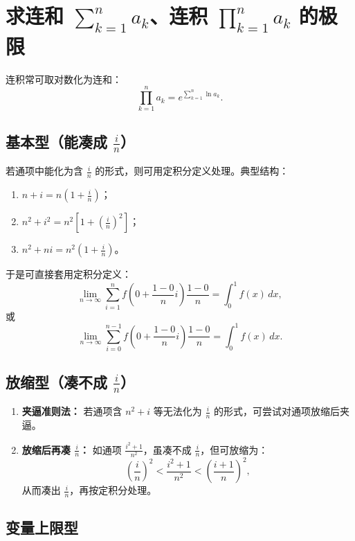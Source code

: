 
\section{求连和 $\sum_{k=1}^{n} a_k$、连积 $\prod_{k=1}^{n} a_k$ 的极限}

连积常可取对数化为连和：
\[
    \prod_{k=1}^{n} a_k = e^{\sum_{k=1}^{n} \ln a_k}.
\]

\subsection{基本型（能凑成 $\frac{i}{n}$）}

若通项中能化为含 $\frac{i}{n}$ 的形式，则可用定积分定义处理。典型结构：

\begin{enumerate}
    \item $n + i = n\left(1 + \frac{i}{n}\right)$；
    \item $n^2 + i^2 = n^2\left[1 + \left(\frac{i}{n}\right)^2\right]$；
    \item $n^2 + ni = n^2\left(1 + \frac{i}{n}\right)$。
\end{enumerate}

于是可直接套用定积分定义：
\[
    \lim_{n \to \infty} \sum_{i=1}^{n} f\!\left(0+\frac{1-0}{n}i\right) \frac{1-0}{n}
    = \int_{0}^{1} f(x)\,dx,
\]
或
\[
    \lim_{n \to \infty} \sum_{i=0}^{n-1} f\!\left(0+\frac{1-0}{n}i\right) \frac{1-0}{n}
    = \int_{0}^{1} f(x)\,dx.
\]

\subsection{放缩型（凑不成 $\frac{i}{n}$）}

\begin{enumerate}
    \item \textbf{夹逼准则法：}
          若通项含 $n^2+i$ 等无法化为 $\frac{i}{n}$ 的形式，可尝试对通项放缩后夹逼。

    \item \textbf{放缩后再凑 $\frac{i}{n}$：}
          如通项 $\frac{i^2+1}{n^2}$，虽凑不成 $\frac{i}{n}$，但可放缩为：
          \[
              \left(\frac{i}{n}\right)^2 < \frac{i^2+1}{n^2} < \left(\frac{i+1}{n}\right)^2,
          \]
          从而凑出 $\frac{i}{n}$，再按定积分处理。
\end{enumerate}

\subsection{变量上限型}

